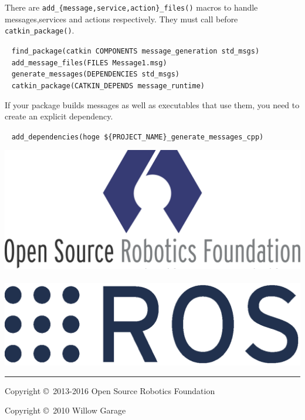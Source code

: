 \documentclass[10pt,landscape]{article}
\newif\ifcatkin
\begin{document}
\begin{multicols}{3}
There are \texttt{add\_\{message,service,action\}\_files()}
macros to handle messages,services and actions
respectively. They must call before \texttt{catkin\_package()}.
\vspace{-1.5mm}
{
\begin{tabbing}
~ \texttt{find\_package(catkin COMPONENTS message\_generation std\_msgs)}\\
~ \texttt{add\_message\_files(FILES Message1.msg)}\\
~ \texttt{generate\_messages(DEPENDENCIES std\_msgs)}\\
~ \texttt{catkin\_package(CATKIN\_DEPENDS message\_runtime)}\\
\end{tabbing}
}
\vspace{-5mm}
If your package builds messages as well as executables that use them,
you need to create an explicit dependency.
\vspace{-2.5mm}
\begin{tabbing}
~ \texttt{add\_dependencies(hoge \$\{PROJECT\_NAME\}\_generate\_messages\_cpp)}\\
\end{tabbing}

\vspace{-5mm}


\else %

\vspace{17cm}

\fi %

\begin{flushright}
\includegraphics[height=.12\columnwidth]{osrf_logo.png}~~
\includegraphics[height=.12\columnwidth]{ros_logo.eps}
\end{flushright}

\vspace{-3mm}

\rule{0.3\linewidth}{0.25pt}

\scriptsize

Copyright \copyright\ 2013-2016 Open Source Robotics Foundation

Copyright \copyright\ 2010 Willow Garage


\end{multicols}
\end{document}
